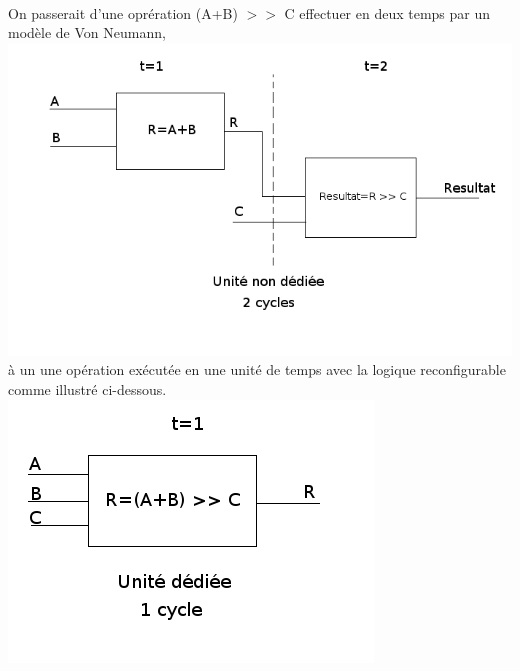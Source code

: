 \\
\\
\\
On passerait d'une oprération (A+B) $>>$ C effectuer en deux temps par un modèle de Von Neumann,\\
\includegraphics[scale=0.5]{bloc2.png}
à un une opération exécutée en une unité de temps avec la logique reconfigurable comme illustré ci-dessous.\\
\includegraphics[scale=0.5]{bloc1.png}